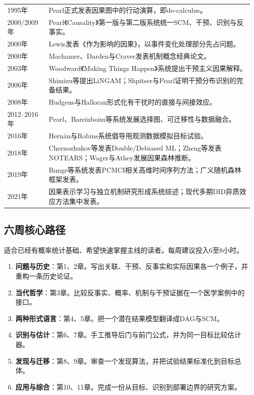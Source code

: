 \begin{longtable}{p{}p{}}
1995年 & Pearl正式发表因果图中的行动演算，即do-calculus。\\
2000/2009年 & Pearl《Causality》第一版与第二版系统统一SCM、干预、识别与反事实。\\
2000年 & Lewis发表《作为影响的因果》，以事件变化处理部分先占问题。\\
2000年 & Machamer、Darden与Craver发表机制概念经典论文。\\
2003年 & Woodward《Making Things Happen》系统提出干预主义因果解释。\\
2006年 & Shimizu等提出LiNGAM；Shpitser与Pearl证明干预分布识别的完备结果。\\
2008年 & Hudgens与Halloran形式化有干扰时的直接与间接效应。\\
2012--2016年 & Pearl、Bareinboim等系统发展选择图、可迁移性与数据融合。\\
2016年 & Hernán与Robins系统倡导用观测数据模拟目标试验。\\
2018年 & Chernozhukov等发表Double/Debiased ML；Zheng等发表NOTEARS；Wager与Athey发展因果森林推断。\\
2019年 & Runge等系统发表PCMCI相关高维时间序列方法；广义随机森林框架发表。\\
2021年 & 因果表示学习与独立机制研究形成系统综述；现代多期DID异质效应方法集中发表。\\
\bottomrule
\end{longtable}

\subsection{六周核心路径}

适合已经有概率统计基础、希望快速掌握主线的读者。每周建议投入6至8小时。

\begin{enumerate}
  \item \textbf{问题与历史}：第1、2章。写出关联、干预、反事实和实际因果各一个例子，并重构一条历史论证。
  \item \textbf{当代哲学}：第3章。比较反事实、概率、机制与干预证据在一个医学案例中的接口。
  \item \textbf{两种形式语言}：第4、5章。把一个潜在结果模型翻译成DAG与SCM。
  \item \textbf{识别与估计}：第6、7章。手工推导后门与前门公式，并为同一目标比较估计器。
  \item \textbf{发现与迁移}：第8、9章。审查一个发现算法，并把试验结果标准化到目标总体。
  \item \textbf{应用与综合}：第10、11章。完成一份从目标、识别到部署边界的研究方案。
\end{enumerate}

